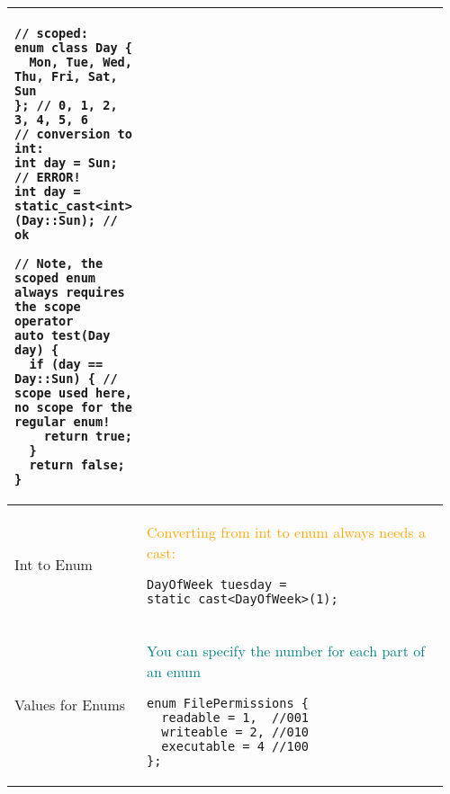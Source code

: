 \documentclass[main.tex,fontsize=8pt,paper=a4,paper=portrait,DIV=calc,]{scrartcl}
\begin{document}
\begin{table}[ht!]
\begin{tabular}{|m{0.2\linewidth}|m{0.755\linewidth}|}
\begin{lstlisting}
// scoped:
enum class Day { 
  Mon, Tue, Wed, Thu, Fri, Sat, Sun
}; // 0, 1, 2, 3, 4, 5, 6
// conversion to int:
int day = Sun; // ERROR!
int day = static_cast<int>(Day::Sun); // ok

// Note, the scoped enum always requires the scope operator
auto test(Day day) {
  if (day == Day::Sun) { // scope used here, no scope for the regular enum!
    return true;
  }
  return false;
}
\end{lstlisting}\\
\hline
Int to Enum & 
\textcolor{orange}{Converting from int to enum always needs a cast:}\newline
\begin{lstlisting}
DayOfWeek tuesday = static_cast<DayOfWeek>(1);
\end{lstlisting}\\
\hline
Values for Enums &
\textcolor{teal}{You can specify the number for each part of an enum}\newline
\begin{lstlisting}
enum FilePermissions {
  readable = 1,  //001
  writeable = 2, //010
  executable = 4 //100
};
\end{lstlisting}\\
\hline

\hline

\hline

\hline

\hline
\end{tabular}
\end{table}
\pagebreak
\end{document}

